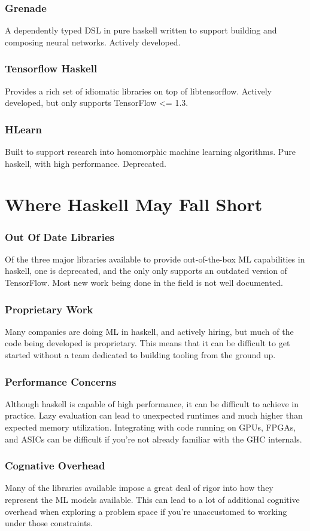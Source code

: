 \documentclass{beamer}
\begin{document}
\begin{frame}
  \frametitle{Grenade}
  A dependently typed DSL in pure haskell written to support building
  and composing neural networks.  Actively developed.
\end{frame}


\begin{frame}
  \frametitle{Tensorflow Haskell}
  Provides a rich set of idiomatic libraries on top of libtensorflow.
  Actively developed, but only supports TensorFlow <= 1.3.
\end{frame}

\begin{frame}
  \frametitle{HLearn}
  Built to support research into homomorphic machine learning
  algorithms.  Pure haskell, with high performance.  Deprecated.
\end{frame}

\section{Where Haskell May Fall Short}

\begin{frame}
  \frametitle{Out Of Date Libraries}
  Of the three major libraries available to provide out-of-the-box ML
  capabilities in haskell, one is deprecated, and the only only
  supports an outdated version of TensorFlow.  Most new work being
  done in the field is not well documented.
\end{frame}

\begin{frame}
  \frametitle{Proprietary Work}
  Many companies are doing ML in haskell, and actively hiring, but
  much of the code being developed is proprietary.  This means that it
  can be difficult to get started without a team dedicated to building
  tooling from the ground up.
\end{frame}

\begin{frame}
  \frametitle{Performance Concerns}
  Although haskell is capable of high performance, it can be difficult
  to achieve in practice.  Lazy evaluation can lead to unexpected
  runtimes and much higher than expected memory utilization.
  Integrating with code running on GPUs, FPGAs, and ASICs can be
  difficult if you're not already familiar with the GHC internals.
\end{frame}

\begin{frame}
  \frametitle{Cognative Overhead}
  Many of the libraries available impose a great deal of rigor into
  how they represent the ML models available.  This can lead to a lot
  of additional cognitive overhead when exploring a problem space if
  you're unaccustomed to working under those constraints.
\end{frame}
\end{document}
